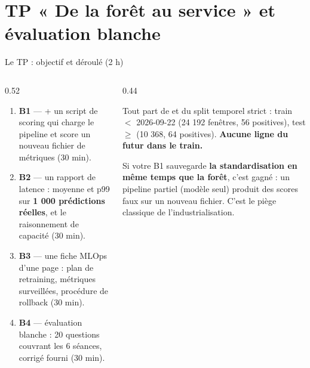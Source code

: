 \section{TP « De la forêt au service » et évaluation blanche}

\begin{frame}{Le TP : objectif et déroulé (2 h)}
\begin{columns}[t]
\begin{column}{0.52\textwidth}
\begin{kbox}
\begin{enumerate}
\item \textbf{B1} ---  + un script de scoring
qui charge le pipeline et score un nouveau fichier de métriques (30 min).
\item \textbf{B2} --- un rapport de latence : moyenne et p99 sur
\textbf{1 000 prédictions réelles}, et le raisonnement de capacité (30 min).
\item \textbf{B3} --- une fiche MLOps d'une page : plan de retraining,
métriques surveillées, procédure de rollback (30 min).
\item \textbf{B4} --- évaluation blanche : 20 questions couvrant les 6
séances, corrigé fourni (30 min).
\end{enumerate}
\end{kbox}
\end{column}
\begin{column}{0.44\textwidth}
\begin{ebox}
Tout part de  et du split temporel strict :
train $<$ 2026-09-22 (24 192 fenêtres, 56 positives), test $\ge$
(10 368, 64 positives). \textbf{Aucune ligne du futur dans le train.}
\end{ebox}
\begin{wbox}
Si votre B1 sauvegarde \textbf{la standardisation en même temps que la
forêt}, c'est gagné : un pipeline partiel (modèle seul) produit des scores
faux sur un nouveau fichier. C'est le piège classique de l'industrialisation.
\end{wbox}
\end{column}
\end{columns}
\end{frame}

